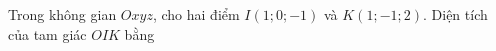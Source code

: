 \begin{ex}
Trong không gian $Oxyz$, cho hai điểm $I(1;0;-1)$ và $K(1;-1;2)$. Diện tích của tam giác $OIK$ bằng
\end{ex}
